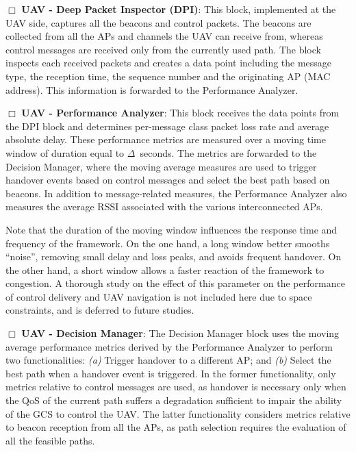 \vspace{1mm}
\noindent
$\Box$ {\bf UAV - Deep Packet Inspector (DPI)}:
This block, implemented at the UAV side, captures all the beacons and control packets. The beacons are collected from all the APs and channels the UAV can receive from, whereas control messages are received only from the currently used path. The block inspects each received packets and creates a data point including the message type, the reception time, the sequence number and the originating AP (MAC address). This information is forwarded to the Performance Analyzer.

\vspace{1mm}
\noindent
$\Box$ {\bf{UAV - Performance Analyzer}}: 
This block receives the data points from the DPI block and determines per-message class packet loss rate and average absolute delay. These performance metrics are measured over a moving time window of duration equal to $\Delta$~seconds. The metrics are forwarded to the Decision Manager, where the moving average measures are used to trigger handover events based on control messages and select the best path based on beacons. In addition to message-related measures, the Performance Analyzer also measures the average RSSI associated with the various interconnected APs.

Note that the duration of the moving window influences the response time and frequency of the framework. On the one hand, a long window better smooths ``noise'', removing small delay and loss peaks, and avoids frequent handover. On the other hand, a short window allows a faster reaction of the framework to congestion. A thorough study on the effect of this parameter on the performance of control delivery and UAV navigation is not included here due to space constraints, and is deferred to future studies.



\vspace{1mm}
\noindent
$\Box$ {\bf{UAV - Decision Manager}}:
The Decision Manager block uses the moving average performance metrics derived by the Performance Analyzer to perform two functionalities: \emph{(a)} Trigger handover to a different AP; and \emph{(b)} Select the best path when a handover event is triggered. In the former functionality, only metrics relative to control messages are used, as handover is necessary only when the QoS of the current path suffers a degradation sufficient to impair the ability of the GCS to control the UAV. The latter functionality considers metrics relative to beacon reception from all the APs, as path selection requires the evaluation of all the feasible paths.

